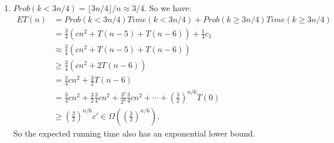 \documentclass[10pt,oneside,reqno]{amsart}
\theoremstyle{plain}
\theoremstyle{definition}
\begin{document}
\begin{enumerate}[label=\arabic*.]
\begin{enumerate}
\item $Prob(k < 3n/4) = \lfloor 3n/4\rfloor/n \approx 3/4$. So we have: 
\begin{equation}
\begin{aligned}
ET(n) &= Prob(k < 3n/4)Time(k < 3n/4) + Prob(k\geq 3n/4)Time(k\geq 3n/4)\\
&= \frac{3}{4}(cn^2 + T(n - 5) + T(n - 6)) + \frac{1}{4}c_1\\
&\approx \frac{3}{4}(cn^2 + T(n - 5) + T(n - 6))\\
&\geq \frac{3}{4}(cn^2 + 2T(n - 6))\\
&= \frac{3}{4}cn^2 + \frac{3}{2}T(n - 6)\\
&= \frac{3}{4}cn^2 + \frac{3}{2}\frac{3}{4}cn^2 + \frac{3^2}{2^2}\frac{3}{4}cn^2 + \cdots + \left(\frac{3}{2}\right)^{n/6}T(0)\\
&\geq \left(\frac{3}{2}\right)^{n/6}c' \in \Omega
\left( \left(\frac{3}{2}\right)^{n/6}\right). 
\end{aligned}
\end{equation}
So the expected running time also has an exponential lower bound. 
\end{enumerate}





 







\end{enumerate}
\end{document}
